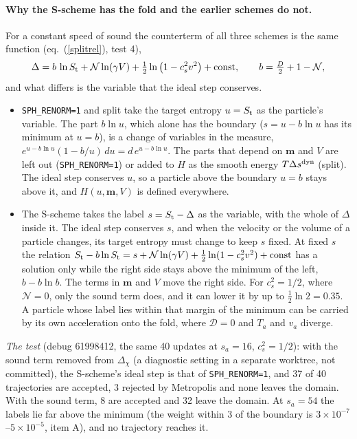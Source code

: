 \documentclass[11pt,aps,preprint,nofootinbib,superscriptaddress,tightenlines]{revtex4-2}
\def\st{\begin{equation}}
\def\stp{\end{equation}}
\def\Eq#1{eq.~(\ref{#1})}
\let\oldparagraph\paragraph
\renewcommand{\paragraph}{\par\bigskip\oldparagraph}
\begin{document}
\paragraph{Why the S-scheme has the fold and the earlier schemes do not.}  For a constant speed of sound the counterterm of all three schemes is the
same function (\Eq{splitrel}, test 4),
\st
\Delta=b\,\ln S_{\rm t}+\mathcal N\ln(\gamma V)+\tfrac12\ln\big(1-c_s^2v^2\big)+\text{const},\qquad b=\tfrac D2+1-\mathcal N ,
\stp
and what differs is the variable that the ideal step conserves.
\begin{itemize}
\item \texttt{SPH\_RENORM=1} and split take the target entropy $u=S_{\rm t}$ as the particle's variable.  The part $b\ln u$, which alone has the
  boundary ($s=u-b\ln u$ has its minimum at $u=b$), is a change of variables in the measure, $e^{u-b\ln u}(1-b/u)\,du=d\,e^{u-b\ln u}$.  The parts that depend
  on $\bm m$ and $V$ are left out (\texttt{SPH\_RENORM=1}) or added to $H$ as the smooth energy $T\Delta s^{\rm dyn}$ (split).  The ideal step
  conserves $u$, so a particle above the boundary $u=b$ stays above it, and $H(u,\bm m,V)$ is defined everywhere.
\item The S-scheme takes the label $s=S_{\rm t}-\Delta$ as the variable, with the whole of $\Delta$ inside it.  The ideal step conserves $s$, and when the
  velocity or the volume of a particle changes, its target entropy must change to keep $s$ fixed.  At fixed $s$ the relation
  $S_{\rm t}-b\ln S_{\rm t}=s+\mathcal N\ln(\gamma V)+\tfrac12\ln(1-c_s^2v^2)+\text{const}$ has a solution only while the right side stays above the minimum of the
  left, $b-b\ln b$.  The terms in $\bm m$ and $V$ move the right side.  For $c_s^2=1/2$, where $\mathcal N=0$, only the sound term does, and it can
  lower it by up to $\tfrac12\ln2=0.35$.  A particle whose label lies within that margin of the minimum can be carried by its own acceleration onto
  the fold, where $\mathcal D=0$ and $T_a$ and $v_a$ diverge.
\end{itemize}
\emph{The test} (debug 61998412, the same 40 updates at $s_a=16$, $c_s^2=1/2$): with the sound term removed from $\Delta_\chi$ (a diagnostic setting
in a separate worktree, not committed), the S-scheme's ideal step is that of \texttt{SPH\_RENORM=1}, and 37 of 40 trajectories are accepted, 3 rejected by
Metropolis and none leaves the domain.  With the sound term, 8 are accepted and 32 leave the domain.  At $s_a=54$ the labels lie far above the
minimum (the weight within 3 of the boundary is $3\times10^{-7}$--$5\times10^{-5}$, item A), and no trajectory reaches it.
\end{document}
